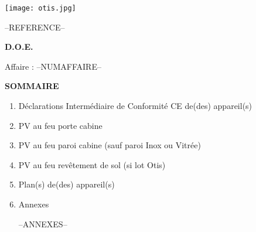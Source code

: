\documentclass[a4paper, oneside, 10pt, french]{article}
\begin{document}
\pagestyle{empty}

\vspace*{2cm}

\begin{center}
\texttt{[image: otis.jpg]}
\end{center}

\vspace{1.5cm}

\begin{center}
\Huge --REFERENCE--
\end{center}

\vspace{2cm}

\begin{center}
\textbf{\Huge D.O.E.}
\end{center}

\vspace{4cm}

\Large Affaire : --NUMAFFAIRE--

\newpage

\vspace*{1cm}

\begin{center}
\textbf{\Huge SOMMAIRE}
\end{center}

\vspace{2cm}

\begin{enumerate}
\item Déclarations Intermédiaire de Conformité CE de(des) appareil(s)\\ \vspace{1em}
\item PV au feu porte cabine\\ \vspace{1em}
\item PV au feu paroi cabine (sauf paroi Inox ou Vitrée)\\ \vspace{1em}
\item PV au feu revêtement de sol (si lot Otis)\\ \vspace{1em}
\item Plan(s) de(des) appareil(s) \\ \vspace{1em}
\item Annexes
\begin{itemize}
--ANNEXES--
\end{itemize}
\end{enumerate}
\end{document}
